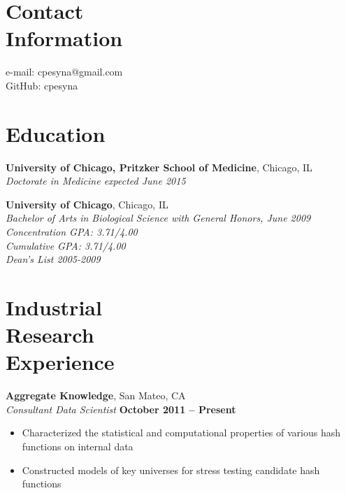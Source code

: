 \documentclass[margin,line]{resume}
\begin{document}
\begin{resume}

    \section{\mysidestyle Contact\\Information}

    e-mail: cpesyna@gmail.com\\
    GitHub: cpesyna \vspace{0mm}

    \section{\mysidestyle Education}
    \textbf{University of Chicago, Pritzker School of Medicine}, Chicago, IL\\%
    \textsl{Doctorate in Medicine expected June 2015}

    \textbf{University of Chicago}, Chicago, IL\\%
    \textsl{Bachelor of Arts in Biological Science with General Honors, June 2009}\\%
    \textsl{Concentration GPA: 3.71/4.00} \\
    \textsl{Cumulative GPA: 3.71/4.00} \\
    \textsl{Dean's List 2005-2009}
    \section{\mysidestyle Industrial\\Research\\Experience}
    \textbf{Aggregate Knowledge}, San Mateo, CA\\\vspace{1mm}
    \textsl{Consultant Data Scientist} \hfill \textbf{October 2011 -- Present}
    \begin{itemize}
    \item Characterized the statistical and computational properties of various hash functions on internal data
    \item Constructed models of key universes for stress testing candidate hash functions
    \end{itemize}


\end{resume}
\end{document}
